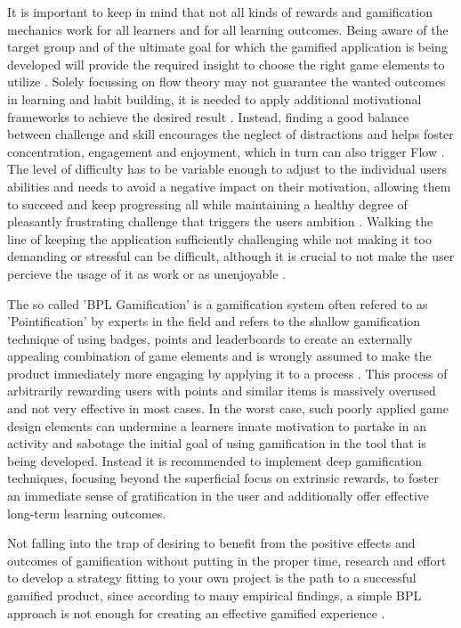 It is important to keep in mind that not all kinds of rewards and gamification mechanics work for all learners and for all learning outcomes. Being aware of the target group and of the ultimate goal for which the gamified application is being developed will provide the required insight to choose the right game elements to utilize \cite{framework}.
Solely focussing on flow theory may not guarantee the wanted outcomes in learning and habit building, it is needed to apply additional motivational frameworks to achieve the desired result \cite{equilibrium}. Instead, finding a good balance between challenge and skill encourages the neglect of distractions and helps foster concentration, engagement and enjoyment, which in turn can also trigger Flow \cite{higher}. The level of difficulty has to be variable enough to adjust to the individual users abilities and needs to avoid a negative impact on their motivation, allowing them to succeed and keep progressing all while maintaining a healthy degree of pleasantly frustrating challenge that triggers the users ambition \cite{model}. Walking the line of keeping the application sufficiently challenging while not making it too demanding or stressful can be difficult, although it is crucial to not make the user percieve the usage of it as work or as unenjoyable \cite{mmo}.

The so called 'BPL Gamification' is a gamification system often refered to as 'Pointification' by experts in the field and refers to the shallow gamification technique of using badges, points and leaderboards to create an externally appealing combination of game elements and is wrongly assumed to make the product immediately more engaging by applying it to a process \cite{equilibrium}. This process of arbitrarily rewarding users with points and similar items is massively overused and not very effective in most cases. In the worst case, such poorly applied game design elements can undermine a learners innate motivation to partake in an activity and sabotage the initial goal of using gamification in the tool that is being developed. Instead it is recommended to implement deep gamification techniques, focusing beyond the superficial focus on extrinsic rewards, to foster an immediate sense of gratification in the user and additionally offer effective long-term learning outcomes.

Not falling into the trap of desiring to benefit from the positive effects and outcomes of gamification without putting in the proper time, research and effort to develop a strategy fitting to your own project is the path to a successful gamified product, since according to many empirical findings, a simple BPL approach is not enough for creating an effective gamified experience \cite{equilibrium}.